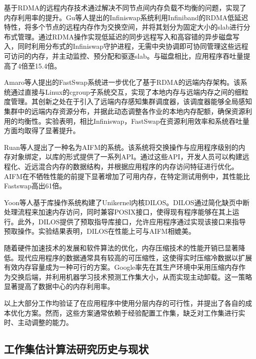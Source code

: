 基于RDMA的远程内存技术通过解决不同节点间内存负载不均衡的问题，实现了内存利用率的提升。Gu等人提出的Infiniswap系统利用Infiniband的RDMA低延迟特性，将多个节点的远程内存作为交换空间，并将其划分为固定大小的slab进行分布式管理。通过RDMA操作实现低延迟的同步远程写入和高容错的异步磁盘写入，同时利用分布式的Infiniswap守护进程，无需中央协调即可协同管理这些远程可访问的内存，并主动监控、预分配和驱逐slab。与磁盘相比，应用程序吞吐量提高了4倍至15.4倍。

Amaro等人提出的FastSwap系统进一步优化了基于RDMA的远端内存架构。该系统通过直接与Linux的cgroup子系统交互，实现了本地内存与远端内存之间的细粒度管理。其创新之处在于引入了远端内存感知集群调度器，该调度器能够全局感知集群中的远端内存资源分布，并据此动态调整各作业的本地内存配额，确保资源利用的均衡性。实验表明，相比Infiniswap，FastSwap在资源利用效率和系统吞吐量方面均取得了显著提升。

Ruan等人\cite{ruan2020aifm}提出了一种名为AIFM的系统。该系统将交换操作与应用程序级别的内存对象绑定，以库的形式提供了一系列API。通过这些API，开发人员可以构建远程化、近远混合内存的数据结构，并根据应用程序的内存访问特征进行优化。AIFM在不牺牲性能的前提下显著增加了可用内存，在特定测试用例中，其性能比Fastswap\cite{10.1145/3342195.3387522}高出61倍。

Yoon等人\cite{yoon2021dilos,yoon2023dilos}基于库操作系统构建了Unikernel内核DILOS。DILOS通过简化缺页中断处理流程来加速内存访问，同时兼容POSIX接口，使得现有程序能够在其上运行。此外，DILOS提供了预取指导库接口，允许应用程序通过实现该接口来指导预取操作。实验结果表明，DILOS在性能上可与AIFM\cite{ruan2020aifm}相媲美。

随着硬件加速技术的发展和软件算法的优化\cite{10.1145/3620666.3651323}，内存压缩技术的性能开销已显著降低。现代应用程序的数据通常具有较高的可压缩性，这使得实时压缩冷数据以扩展有效内存容量成为一种可行的方案。Google\cite{10.1145/3297858.3304053}率先在其生产环境中采用压缩内存作为交换后端，并利用机器学习技术预测工作集大小，从而实现主动卸载。这一策略显著提高了数据中心的内存利用率。

以上大部分工作\cite{10.1145/3132402.3132409,201565,10.1145/3342195.3387522,ruan2020aifm,yoon2021dilos,yoon2023dilos}均验证了在应用程序中使用分层内存的可行性，并提出了各自的成本优化方案。然而，这些方案通常依赖于经验配置工作集，缺乏对工作集进行实时、主动调整的能力。

\subsection{工作集估计算法研究历史与现状}
\label{sec:工作集估计算法研究历史与现状}

